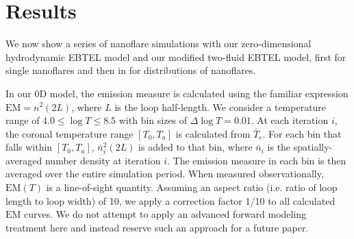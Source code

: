\documentclass[apj]{emulateapj}
\begin{document}
	\section{Results}
	\label{sec:results}
	\par We now show a series of nanoflare simulations with our zero-dimensional hydrodynamic EBTEL model \citep{klimchuk_highly_2008, cargill_enthalpy-based_2012, cargill_enthalpy-based_2012-1, cargill_modelling_2015} and our modified two-fluid EBTEL model, first for single nanoflares and then in  for distributions of nanoflares.
	\par In our 0D model, the emission measure is calculated using the familiar expression $\mathrm{EM}=n^2(2L)$, where $L$ is the loop half-length. We consider a temperature range of $4.0\le\log{T}\le8.5$ with bin sizes of $\Delta\log{T}=0.01$. At each iteration $i$, the coronal temperature range $[T_0,T_a]$ is calculated from $\bar{T}_e$. For each bin that falls within $[T_0,T_a]$, $\bar{n}_i^2(2L)$ is added to that bin, where $\bar{n}_i$ is the spatially-averaged number density at iteration $i$. The emission measure in each bin is then averaged over the entire simulation period. When measured observationally, $\mathrm{EM}(T)$ is a line-of-sight quantity. Assuming an aspect ratio (i.e. ratio of loop length to loop width) of 10, we apply a correction factor 1/10 to all calculated $\mathrm{EM}$ curves. We do not attempt to apply an advanced forward modeling treatment here and instead reserve such an approach for a future paper.
\end{document}
